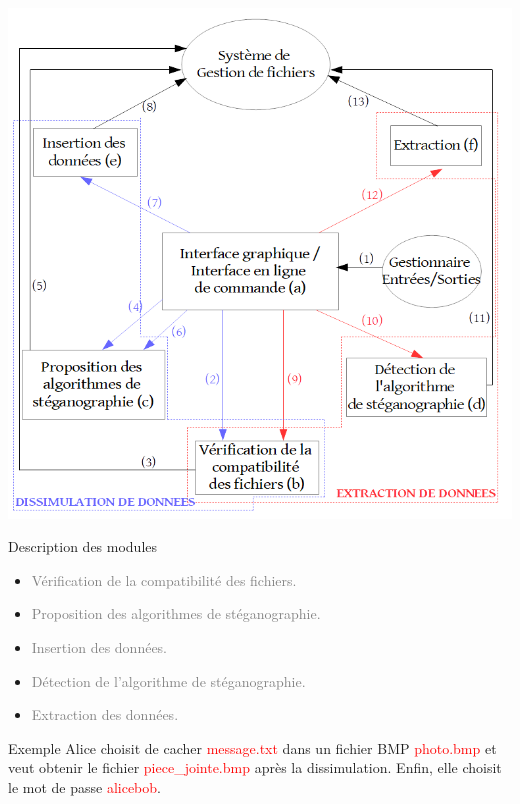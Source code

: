 \documentclass{beamer}
\begin{document}
  \begin{frame}
  \hspace{1.5cm}
  \includegraphics[scale=0.25]{pictures/organigramme_extraction.png}
  \end{frame}
  
  \begin{frame} %
	\begin{block}{Description des modules}
	\begin{itemize}
	[circle]
	\item \textcolor{gray} {Vérification de la compatibilité des fichiers.}
	\item \textcolor{gray} {Proposition des algorithmes de stéganographie.}
	\item \textcolor{gray} {Insertion des données.}
	\item \textcolor{gray} {Détection de l'algorithme de stéganographie.}
	\item \textcolor{gray} {Extraction des données.}
	\end{itemize}
	\end{block}
	
	\begin{exampleblock}{Exemple} 
	Alice choisit de cacher \textcolor{red}{message.txt} dans un fichier 
	BMP \textcolor{red}{photo.bmp} et veut obtenir le fichier 
	\textcolor{red}{piece\_jointe.bmp} après la 
	dissimulation. Enfin, elle choisit le mot de passe \textcolor{red}{alicebob}. 
	\end{exampleblock}
  \end{frame}
  
\end{document}
